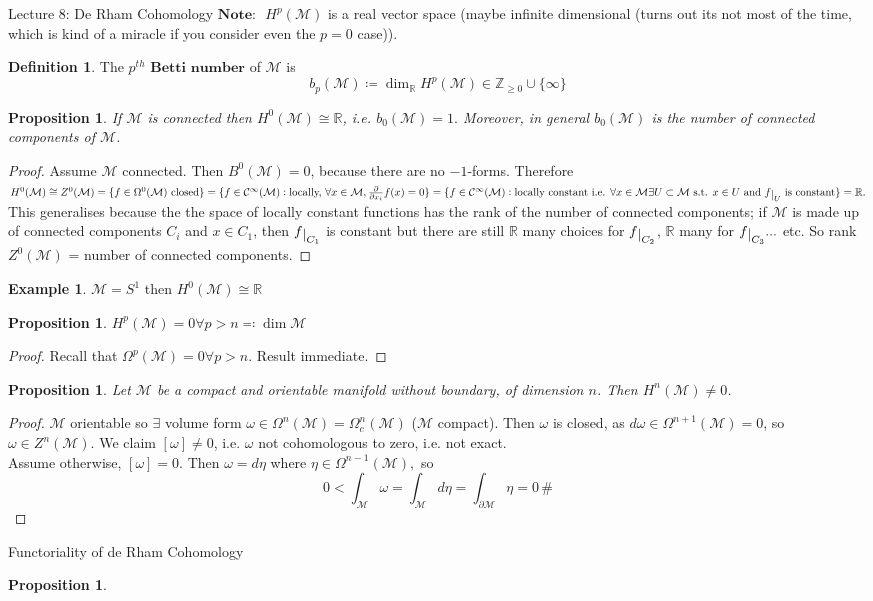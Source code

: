 \documentclass[10pt]{article}
\theoremstyle{plain}
\newtheorem{prop}[thm]{Proposition}
\theoremstyle{definition}
\newtheorem{defn}[thm]{Definition} %
\newtheorem{exmp}[thm]{Example} %
\newcommand{\myand}{\text{ and }}
\newcommand{\st}{\text{ s.t. }}
\newcommand{\Note}{\textbf{Note: }}
\newcommand{\Real}{\mathbb{R}}
\newcommand{\man}{\mathcal{M}}
\newcommand{\pformman}[1]{\Omega^{#1}(\man)}
\newcommand{\compactpformman}[1]{\Omega^{#1}_c(\man)}
\newcommand{\iparderiv}[1]{\frac{\partial}{\partial x_{#1}}}
\newcommand{\deriv}{d}
\newcommand{\dw}{d\omega}
\newcommand{\cts}[1]{\mathcal{C}^{\infty}(#1)}
\def\restrict#1{\raise-.5ex\hbox{\ensuremath|}_{#1}}
\newcommand{\cohomman}[1]{H^{#1}(\man)}
\newcommand{\coZman}[1]{Z^{#1}(\man)}
\begin{document}
\begin{section}{Lecture 8: De Rham Cohomology}
$\Note$ $H^p(\man)$ is a real vector space (maybe infinite dimensional (turns out its not most of the time, which is kind of a miracle if you consider even the $p=0$ case)).
\begin{defn}
The $p^{th}$ $\textbf{Betti number}$ of $\man$ is 
$$b_p(\man)\coloneqq \dim_\Real H^p(\man) \in \mathbb{Z}_{\geq 0} \cup \{\infty \}$$
\end{defn}
\begin{prop}
If $\man$ is connected then $H^0(\man) \cong \Real$, i.e. $b_0(\man) = 1.$ Moreover, in general $b_0(\man)  $ is the number of connected components of $\man$.
\end{prop}
\begin{proof}
Assume $\man$ connected. Then $B^0(\man) = 0$, because there are no $-1$-forms. Therefore $\cohomman{0} \cong \coZman{0} = \{f\in \pformman{0} \text{ closed}\} = \{f\in\cts{\man} : \text{locally, } \forall x\in \man, \iparderiv{i}{} f(x) = 0\} = \{f\in\cts{\man} : \text{locally constant i.e. } \forall x \in \man \exists U\subset \man \st x \in U \myand f\restrict{U} \text{ is constant}\} = \Real.$\\
This generalises because the the space of locally constant functions has the rank of the number of connected components; if $\man$ is made up of connected components $C_i$ and $x\in C_1$, then $f\restrict{C_1}$ is constant but there are still $\Real$ many choices for $f\restrict{C_2}$, $\Real$ many for $f\restrict{C_3} ...$ etc. So rank $\coZman{0}$ = number of connected components.
\end{proof}
\begin{exmp}
$\man = S^1$ then $\cohomman{0} \cong \Real$
\end{exmp}
\begin{prop}
$\cohomman{p} = 0 \forall p > n \eqqcolon \dim \man$
\end{prop}
\begin{proof}
Recall that $\pformman{p} = 0 \forall p > n.$ Result immediate.
\end{proof}
\begin{prop}
Let $\man$ be a compact and orientable manifold without boundary, of dimension $n$. Then $\cohomman{n} \neq 0$.
\end{prop}
\begin{proof}
$\man$ orientable so $\exists $ volume form $\omega \in \pformman{n} = \compactpformman{n}$ ($\man$ compact). Then $\omega$ is closed, as $\dw \in \pformman{n+1} = 0$, so $\omega \in \coZman{n}$. We claim $[\omega] \neq 0$, i.e. $\omega$ not cohomologous to zero, i.e. not exact. \\Assume otherwise, $[\omega] = 0$. Then $\omega = \deriv \eta$ where $\eta \in \pformman{n-1},$ so
$$0< \int_\man \omega = \int_\man \deriv \eta = \int_{\partial \man} \eta = 0\,\#$$
\end{proof}
\begin{subsection}{Functoriality of de Rham Cohomology}
\begin{prop}


\end{prop}
\end{subsection}
\end{section}
\end{document}
